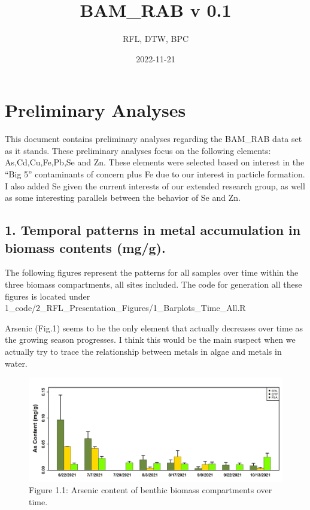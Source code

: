 \documentclass[
]{article}
\title{BAM\_RAB v 0.1}
\author{RFL, DTW, BPC}
\date{2022-11-21}
\begin{document}
\maketitle

\hypertarget{preliminary-analyses}{%
\section{Preliminary Analyses}\label{preliminary-analyses}}

This document contains preliminary analyses regarding the BAM\_RAB data
set as it stands. These preliminary analyses focus on the following
elements: As,Cd,Cu,Fe,Pb,Se and Zn. These elements were selected based
on interest in the ``Big 5'' contaminants of concern plus Fe due to our
interest in particle formation. I also added Se given the current
interests of our extended research group, as well as some interesting
parallels between the behavior of Se and Zn.

\hypertarget{temporal-patterns-in-metal-accumulation-in-biomass-contents-mgg.}{%
\subsection{1. Temporal patterns in metal accumulation in biomass
contents
(mg/g).}\label{temporal-patterns-in-metal-accumulation-in-biomass-contents-mgg.}}

The following figures represent the patterns for all samples over time
within the three biomass compartments, all sites included. The code for
generation all these figures is located under
1\_code/2\_RFL\_Presentation\_Figures/1\_Barplots\_Time\_All.R

Arsenic (Fig.1) seems to be the only element that actually decreases
over time as the growing season progresses. I think this would be the
main suspect when we actually try to trace the relationship between
metals in algae and metals in water.

\begin{figure}
\includegraphics[width=1\linewidth]{Figures/1} \caption[Figure 1.1]{Figure 1.1: Arsenic content of benthic biomass compartments over time.}\label{fig:unnamed-chunk-1}
\end{figure}
\end{document}
